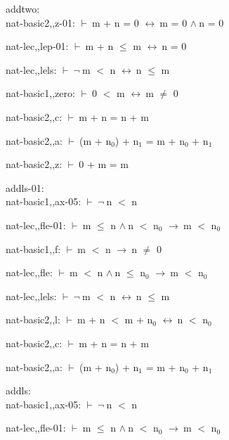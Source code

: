 \documentclass[a4paper]{article}
\newcommand{\Fol}{\mbox{$\vdash\ $}}
\newcommand{\Not}{\mbox{$\neg\ $}}
\newcommand{\And}{\mbox{$\wedge\ $}}
\newcommand{\Imp}{\mbox{$\rightarrow\ $}}
\newcommand{\Equiv}{\mbox{$\leftrightarrow\ $}}
\begin{document}
\bigskip

addtwo:\\ nat-basic2,,z-01: 
 \Fol m + n = 0 \Equiv m = 0 \And n = 0



nat-lec,,lep-01: 
 \Fol m + n $\le$ m \Equiv n = 0



nat-lec,,lels: 
 \Fol \Not m $<$ n \Equiv n $\le$ m



nat-basic1,,zero: 
 \Fol 0 $<$ m \Equiv m $\neq$ 0



nat-basic2,,c: 
 \Fol m + n = n + m



nat-basic2,,a: 
 \Fol (m + $\mbox{n}_{0}$) + $\mbox{n}_{1}$ = m + $\mbox{n}_{0}$ + $\mbox{n}_{1}$



nat-basic2,,z: 
 \Fol 0 + m = m



\bigskip

addls-01:\\ nat-basic1,,ax-05: 
 \Fol \Not n $<$ n



nat-lec,,fle-01: 
 \Fol m $\le$ n \And n $<$ $\mbox{n}_{0}$ \Imp m $<$ $\mbox{n}_{0}$



nat-basic1,,f: 
 \Fol m $<$ n \Imp n $\neq$ 0



nat-lec,,fle: 
 \Fol m $<$ n \And n $\le$ $\mbox{n}_{0}$ \Imp m $<$ $\mbox{n}_{0}$



nat-lec,,lels: 
 \Fol \Not m $<$ n \Equiv n $\le$ m



nat-basic2,,l: 
 \Fol m + n $<$ m + $\mbox{n}_{0}$ \Equiv n $<$ $\mbox{n}_{0}$



nat-basic2,,c: 
 \Fol m + n = n + m



nat-basic2,,a: 
 \Fol (m + $\mbox{n}_{0}$) + $\mbox{n}_{1}$ = m + $\mbox{n}_{0}$ + $\mbox{n}_{1}$



\bigskip

addls:\\ nat-basic1,,ax-05: 
 \Fol \Not n $<$ n



nat-lec,,fle-01: 
 \Fol m $\le$ n \And n $<$ $\mbox{n}_{0}$ \Imp m $<$ $\mbox{n}_{0}$
\end{document}
